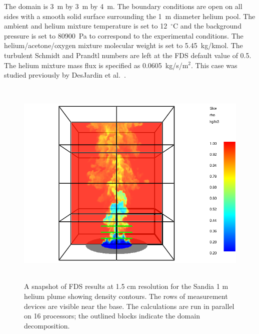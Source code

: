 The domain is 3~m by 3~m by 4~m. The boundary conditions are open on all sides with a smooth solid surface surrounding the 1~m diameter helium pool.  The ambient and helium mixture temperature is set to 12~$^\circ$C and the background pressure is set to 80900~Pa to correspond to the experimental conditions.  The helium/acetone/oxygen mixture molecular weight is set to 5.45~kg/kmol.  The turbulent Schmidt and Prandtl numbers are left at the FDS default value of 0.5.  The helium mixture mass flux is specified as 0.0605~kg/s/m$^2$. This case was studied previously by DesJardin et al.~\cite{DesJardin:2004}.
\begin{figure}[h]
\begin{center}
\includegraphics[height=4in]{FIGURES/Sandia_Plumes/Sandia_He_1m_image}
\caption[Sandia 1~m helium plume image]{A snapshot of FDS results at 1.5 cm resolution for the Sandia 1 m helium plume showing density contours.  The rows of measurement devices are visible near the base. The calculations are run in parallel on 16 processors; the outlined blocks indicate the domain decomposition.}
\label{Sandia_He_1m_image}
\end{center}
\end{figure}

\newpage

